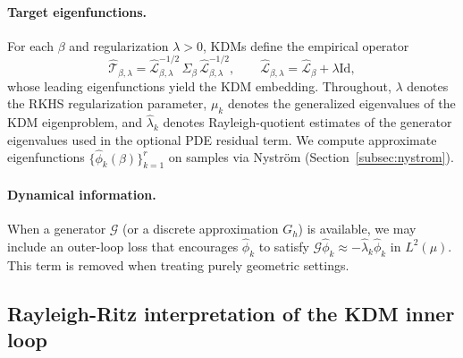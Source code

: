 \documentclass[11pt]{article}
\theoremstyle{remark}
\newcommand{\Id}{\mathrm{Id}}
\begin{document}
\paragraph{Target eigenfunctions.}
For each $\beta$ and regularization $\lambda>0$, KDMs define the empirical operator
\[
\widehat{\mathcal{T}}_{\beta,\lambda}
=
\widehat{\mathcal{L}}_{\beta,\lambda}^{-1/2}\,\widehat{\Sigma}_\beta\,\widehat{\mathcal{L}}_{\beta,\lambda}^{-1/2},
\qquad
\widehat{\mathcal{L}}_{\beta,\lambda}=\widehat{\mathcal{L}}_\beta+\lambda \Id,
\]
whose leading eigenfunctions yield the KDM embedding.
Throughout, $\lambda$ denotes the RKHS regularization parameter, $\mu_k$ denotes the generalized eigenvalues of the KDM eigenproblem, and $\widehat{\lambda}_k$ denotes Rayleigh-quotient estimates of the generator eigenvalues used in the optional PDE residual term.
We compute approximate eigenfunctions $\{\widehat{\phi}_k(\beta)\}_{k=1}^r$ on samples via Nystr\"om (Section~\ref{subsec:nystrom}).

\paragraph{Dynamical information.}
When a generator $\mathcal{G}$ (or a discrete approximation $G_h$) is available, we may include an outer-loop loss that encourages $\widehat{\phi}_k$ to satisfy $\mathcal{G}\widehat{\phi}_k\approx -\widehat{\lambda}_k\widehat{\phi}_k$ in $L^2(\mu)$.
This term is removed when treating purely geometric settings.

\subsection{Rayleigh-Ritz interpretation of the KDM inner loop}
\label{subsec:rayleigh-ritz}
\end{document}
